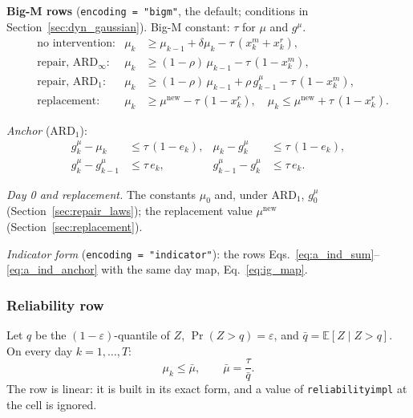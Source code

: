 \documentclass[11pt,a4paper]{article}
\theoremstyle{plain}
\theoremstyle{definition}
\newcommand{\ARDinf}{\mathrm{ARD}_{\infty}}
\newcommand{\ARDone}{\mathrm{ARD}_{1}}
\newcommand{\new}{\mathrm{new}}
\renewcommand{\_}{\textunderscore\allowbreak{}}
\begin{document}
\textbf{Big-M rows} (\texttt{encoding = "bigm"}, the default; conditions in
Section~\ref{sec:dyn_gaussian}). Big-M constant: $\tau$ for $\mu$ and $g^{\mu}$.
\begin{align}
  &\text{no intervention:} & \mu_k &\geq \mu_{k-1} + \delta\mu_k - \tau\,(x^m_k + x^r_k),
    \label{eq:ig_mu_carry} \\
  &\text{repair, } \ARDinf\text{:} & \mu_k &\geq (1-\rho)\,\mu_{k-1} - \tau\,(1 - x^m_k),
    \label{eq:ig_mu_inf} \\
  &\text{repair, } \ARDone\text{:} & \mu_k &\geq (1-\rho)\,\mu_{k-1} + \rho\, g^{\mu}_{k-1}
    - \tau\,(1 - x^m_k),
    \label{eq:ig_mu_one} \\
  &\text{replacement:} & \mu_k &\geq \mu^{\new} - \tau\,(1 - x^r_k), \quad
    \mu_k \leq \mu^{\new} + \tau\,(1 - x^r_k).
    \label{eq:ig_mu_repl}
\end{align}

\emph{Anchor} ($\ARDone$):
\begin{align}
  g^{\mu}_k - \mu_k &\leq \tau\,(1 - e_k), & \mu_k - g^{\mu}_k &\leq \tau\,(1 - e_k),
    \label{eq:ig_anchor_set} \\
  g^{\mu}_k - g^{\mu}_{k-1} &\leq \tau\, e_k, & g^{\mu}_{k-1} - g^{\mu}_k &\leq \tau\, e_k.
    \label{eq:ig_anchor_keep}
\end{align}

\emph{Day 0 and replacement.} The constants $\mu_0$ and, under $\ARDone$, $g^{\mu}_0$
(Section~\ref{sec:repair_laws}); the replacement value $\mu^{\new}$
(Section~\ref{sec:replacement}).

\emph{Indicator form} (\texttt{encoding = "indicator"}): the rows
Eqs.~\eqref{eq:a_ind_sum}--\eqref{eq:a_ind_anchor} with the same day map,
Eq.~\eqref{eq:ig_map}.

\subsubsection{Reliability row}

Let $q$ be the $(1-\varepsilon)$-quantile of $Z$, $\Pr(Z > q) = \varepsilon$, and
$\bar q = \mathbb{E}[Z \mid Z > q]$. On every day $k = 1, \ldots, T$:
\begin{equation}
  \mu_k \leq \bar\mu, \qquad \bar\mu = \frac{\tau}{\bar q}.
  \label{eq:ig_row}
\end{equation}
The row is linear: it is built in its exact form, and a value of
\texttt{reliability\_impl} at the cell is ignored.
\end{document}
